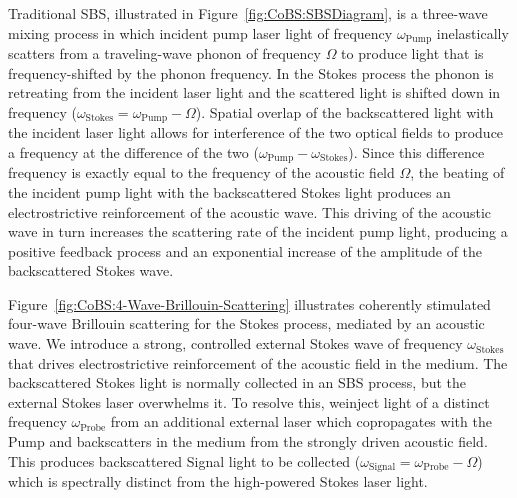 Traditional \ac{SBS}, illustrated in Figure~\ref{fig:CoBS:SBSDiagram}, is a three-wave mixing process in which incident pump laser light of frequency \(\omega_{\mathrm{Pump}}\) inelastically scatters from a traveling-wave phonon of frequency \(\Omega\) to produce light that is frequency-shifted by the phonon frequency. In the Stokes process the phonon is retreating from the incident laser light and the scattered light is shifted down in frequency (\(\omega_{\mathrm{Stokes}} = \omega_{\mathrm{Pump}} - \Omega\)). Spatial overlap of the backscattered light with the incident laser light allows for interference of the two optical fields to produce a frequency at the difference of the two (\(\omega_{\mathrm{Pump}} - \omega_{\mathrm{Stokes}}\)). Since this difference frequency is exactly equal to the frequency of the acoustic field \(\Omega\), the beating of the incident pump light with the backscattered Stokes light produces an electrostrictive reinforcement of the acoustic wave. This driving of the acoustic wave in turn increases the scattering rate of the incident pump light, producing a positive feedback process and an exponential increase of the amplitude of the backscattered Stokes wave.

Figure~\ref{fig:CoBS:4-Wave-Brillouin-Scattering} illustrates coherently stimulated four-wave Brillouin scattering for the Stokes process, mediated by an acoustic wave. We introduce a strong, controlled external Stokes wave of frequency \(\omega_{\mathrm{Stokes}}\) that drives electrostrictive reinforcement of the acoustic field in the medium. The backscattered Stokes light is normally collected in an \ac{SBS} process, but the external Stokes laser overwhelms it. To resolve this, weinject light of a distinct frequency \(\omega_{\mathrm{Probe}}\) from an additional external laser which copropagates with the Pump and backscatters in the medium from the strongly driven acoustic field. This produces backscattered Signal light to be collected (\(\omega_{\mathrm{Signal}} = \omega_{\mathrm{Probe}} - \Omega\)) which is spectrally distinct from the high-powered Stokes laser light.

